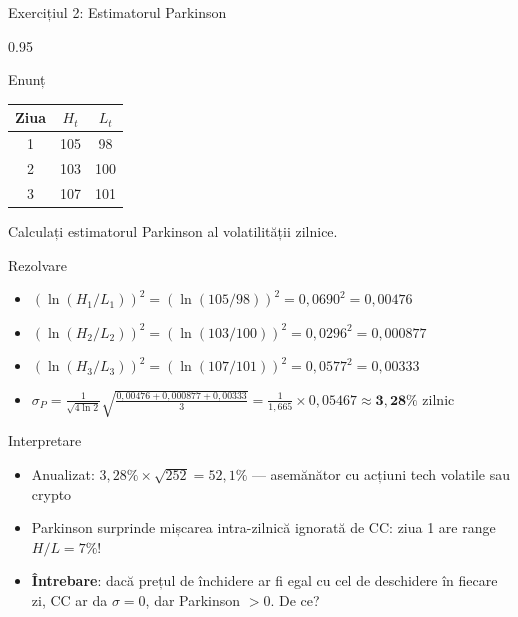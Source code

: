 \documentclass[9pt, aspectratio=169, t]{beamer}
\begin{document}
\begin{frame}[shrink=25]{Exercițiul 2: Estimatorul Parkinson}
    \begin{cminipage}{0.95\textwidth}
    \begin{block}{Enunț}
    \begin{center}
    {\small\renewcommand{\arraystretch}{1.3}
    \begin{tabular}{c c c}
    \toprule
    Ziua & $H_t$ & $L_t$ \\
    \midrule
    1 & 105 & 98 \\
    2 & 103 & 100 \\
    3 & 107 & 101 \\
    \bottomrule
    \end{tabular}}
    \end{center}
    Calculați estimatorul Parkinson al volatilității zilnice.
    \end{block}
    \vspace{0.1cm}
    \begin{exampleblock}{Rezolvare}
    \begin{itemize}\setlength{\itemsep}{0pt}
        \item $(\ln(H_1/L_1))^2 = (\ln(105/98))^2 = 0{,}0690^2 = 0{,}00476$
        \item $(\ln(H_2/L_2))^2 = (\ln(103/100))^2 = 0{,}0296^2 = 0{,}000877$
        \item $(\ln(H_3/L_3))^2 = (\ln(107/101))^2 = 0{,}0577^2 = 0{,}00333$
        \item $\sigma_P = \frac{1}{\sqrt{4\ln 2}}\sqrt{\frac{0{,}00476 + 0{,}000877 + 0{,}00333}{3}} = \frac{1}{1{,}665} \times 0{,}05467 \approx \mathbf{3{,}28\%}$ zilnic
    \end{itemize}
    \end{exampleblock}
    \begin{alertblock}{Interpretare}
    \begin{itemize}\setlength{\itemsep}{0pt}
        \item Anualizat: $3{,}28\% \times \sqrt{252} = 52{,}1\%$ --- asemănător cu acțiuni tech volatile sau crypto
        \item Parkinson surprinde mișcarea intra-zilnică ignorată de CC: ziua 1 are range $H/L = 7\%$!
        \item \textbf{Întrebare}: dacă prețul de închidere ar fi egal cu cel de deschidere în fiecare zi, CC ar da $\sigma = 0$, dar Parkinson $> 0$. De ce?
    \end{itemize}
    \end{alertblock}
    \end{cminipage}
\end{frame}
\end{document}

